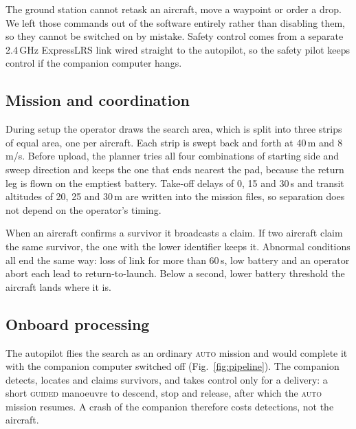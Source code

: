 \documentclass[conference]{IEEEtran}
\begin{document}
The ground station cannot retask an aircraft, move a waypoint or order a drop.
We left those commands out of the software entirely rather than disabling them,
so they cannot be switched on by mistake. Safety control comes from a separate
2.4\,GHz ExpressLRS link wired straight to the autopilot, so the safety pilot
keeps control if the companion computer hangs.

\subsection{Mission and coordination}

During setup the operator draws the search area, which is split into three
strips of equal area, one per aircraft. Each strip is swept back and forth at
40\,m and 8\,m/s. Before upload, the planner tries all four combinations of
starting side and sweep direction and keeps the one that ends nearest the pad,
because the return leg is flown on the emptiest battery. Take-off delays of 0,
15 and 30\,s and transit altitudes of 20, 25 and 30\,m are written into the
mission files, so separation does not depend on the operator's timing.

When an aircraft confirms a survivor it broadcasts a claim. If two aircraft
claim the same survivor, the one with the lower identifier keeps it. Abnormal
conditions all end the same way: loss of link for more than 60\,s, low battery
and an operator abort each lead to return-to-launch. Below a second, lower
battery threshold the aircraft lands where it is.

\subsection{Onboard processing}

The autopilot flies the search as an ordinary \textsc{auto} mission and would
complete it with the companion computer switched off (Fig.~\ref{fig:pipeline}).
The companion detects, locates and claims survivors, and takes control only for
a delivery: a short \textsc{guided} manoeuvre to descend, stop and release,
after which the \textsc{auto} mission resumes. A crash of the companion
therefore costs detections, not the aircraft.
\end{document}
